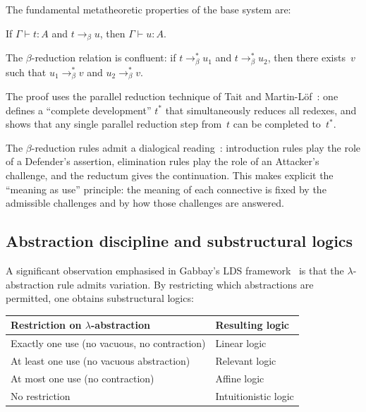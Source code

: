 \documentclass[manuscript]{BSLstyle}
\begin{document}
The fundamental metatheoretic properties of the base system are:

\begin{theorem}\label{thm:subject-reduction}
If\/ $\Gamma \vdash t : A$ and $t \to_\beta u$, then\/ $\Gamma \vdash u : A$.
\end{theorem}

\begin{theorem}\label{thm:church-rosser-base}
The $\beta$-reduction relation is confluent: if\/ $t \to_\beta^* u_1$
and $t \to_\beta^* u_2$, then there exists~$v$ such that\/
$u_1 \to_\beta^* v$ and $u_2 \to_\beta^* v$.
\end{theorem}

\noindent
The proof uses the parallel reduction technique of Tait and
Martin-L\"of~\cite{Tait67}: one defines a ``complete development'' $t^*$ that
simultaneously reduces all redexes, and shows that any single parallel
reduction step from~$t$ can be completed to~$t^*$.

\begin{remark}
The $\beta$-reduction rules admit a dialogical
reading~\cite{deQueiroz91:meaning,deQueiroz01:meaning,deQueiroz08:reduction}:
introduction rules play the role of a Defender's assertion, elimination
rules play the role of an Attacker's challenge, and the reductum gives
the continuation.  This makes explicit the ``meaning as use'' principle:
the meaning of each connective is fixed by the admissible challenges
and by how those challenges are answered.
\end{remark}

\subsection{Abstraction discipline and substructural logics}

A significant observation emphasised in Gabbay's LDS
framework~\cite{Gabbay96:LDS} is that the $\lambda$-abstraction rule
admits variation.  By restricting which abstractions are permitted, one
obtains substructural logics:

\begin{center}
\small
\begin{tabular}{ll}
\toprule
\textbf{Restriction on $\lambda$-abstraction} & \textbf{Resulting logic} \\
\midrule
Exactly one use (no vacuous, no contraction) & Linear logic~\cite{Girard87:tcs} \\
At least one use (no vacuous abstraction) & Relevant logic \\
At most one use (no contraction) & Affine logic \\
No restriction & Intuitionistic logic \\
\bottomrule
\end{tabular}
\end{center}
\end{document}
